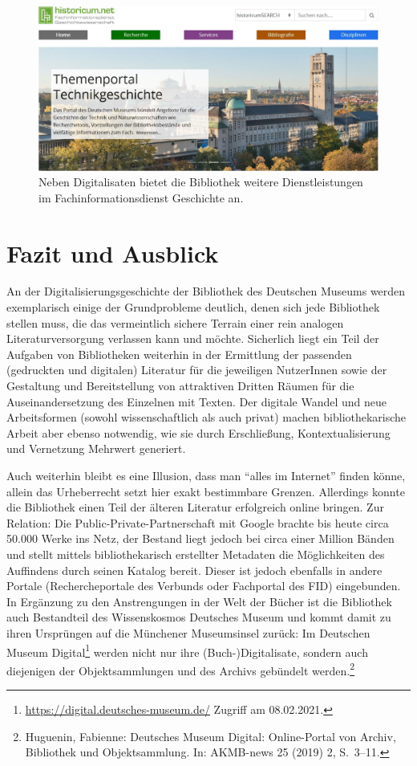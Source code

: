\documentclass[a4paper,
fontsize=11pt,
oneside,
numbers=noperiodatend,
parskip=half-,
bibliography=totoc,
final
]{scrartcl}
\begin{document}
\begin{figure}
\centering
\includegraphics[width=.70\textwidth]{img/Abb7.jpg}
\caption{Neben Digitalisaten bietet die Bibliothek weitere
Dienstleistungen im Fachinformationsdienst Geschichte an.}
\end{figure}

\hypertarget{fazit-und-ausblick}{%
\section{Fazit und Ausblick}\label{fazit-und-ausblick}}

An der Digitalisierungsgeschichte der Bibliothek des Deutschen Museums
werden exemplarisch einige der Grundprobleme deutlich, denen sich jede
Bibliothek stellen muss, die das vermeintlich sichere Terrain einer rein
analogen Literaturversorgung verlassen kann und möchte. Sicherlich liegt
ein Teil der Aufgaben von Bibliotheken weiterhin in der Ermittlung der
passenden (gedruckten und digitalen) Literatur für die jeweiligen
NutzerInnen sowie der Gestaltung und Bereitstellung von attraktiven
Dritten Räumen für die Auseinandersetzung des Einzelnen mit Texten. Der
digitale Wandel und neue Arbeitsformen (sowohl wissenschaftlich als auch
privat) machen bibliothekarische Arbeit aber ebenso notwendig, wie sie
durch Erschließung, Kontextualisierung und Vernetzung Mehrwert
generiert.

Auch weiterhin bleibt es eine Illusion, dass man \enquote{alles im
Internet} finden könne, allein das Urheberrecht setzt hier exakt
bestimmbare Grenzen. Allerdings konnte die Bibliothek einen Teil der
älteren Literatur erfolgreich online bringen. Zur Relation: Die
Public-Private-Partnerschaft mit Google brachte bis heute circa 50.000
Werke ins Netz, der Bestand liegt jedoch bei circa einer Million Bänden
und stellt mittels bibliothekarisch erstellter Metadaten die
Möglichkeiten des Auffindens durch seinen Katalog bereit. Dieser ist
jedoch ebenfalls in andere Portale (Rechercheportale des Verbunds oder
Fachportal des FID) eingebunden. In Ergänzung zu den Anstrengungen in
der Welt der Bücher ist die Bibliothek auch Bestandteil des
Wissenskosmos Deutsches Museum und kommt damit zu ihren Ursprüngen auf
die Münchener Museumsinsel zurück: Im Deutschen Museum
Digital\footnote{\url{https://digital.deutsches-museum.de/} Zugriff am
  08.02.2021.} werden nicht nur ihre (Buch-)Digitalisate, sondern auch
diejenigen der Objektsammlungen und des Archivs gebündelt
werden.\footnote{Huguenin, Fabienne: Deutsches Museum Digital:
  Online-Portal von Archiv, Bibliothek und Objektsammlung. In:
  AKMB-news 25 (2019) 2, S.~3--11.}
\end{document}
